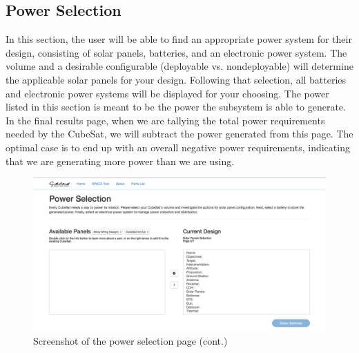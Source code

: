\documentclass[a4, 12 pt]{article} %
\begin{document}
\subsection{Power Selection}
In this section, the user will be able to find an appropriate power system for their design, consisting of solar panels, batteries, and an electronic power system. The volume and a desirable configurable (deployable vs. nondeployable) will determine the applicable solar panels for your design. Following that selection, all batteries and electronic power systems will be displayed for your choosing. The power listed in this section is meant to be the power the subsystem is able to generate. In the final results page, when we are tallying the total power requirements needed by the CubeSat, we will subtract the power generated from this page. The optimal case is to end up with an overall negative power requirements, indicating that we are generating more power than we are using. 
\begin{figure}[H]
\begin{center}
\includegraphics[width=\linewidth]{7}
\caption{Screenshot of the power selection page (cont.)}
\label{default}
\end{center}
\end{figure}
\end{document}
